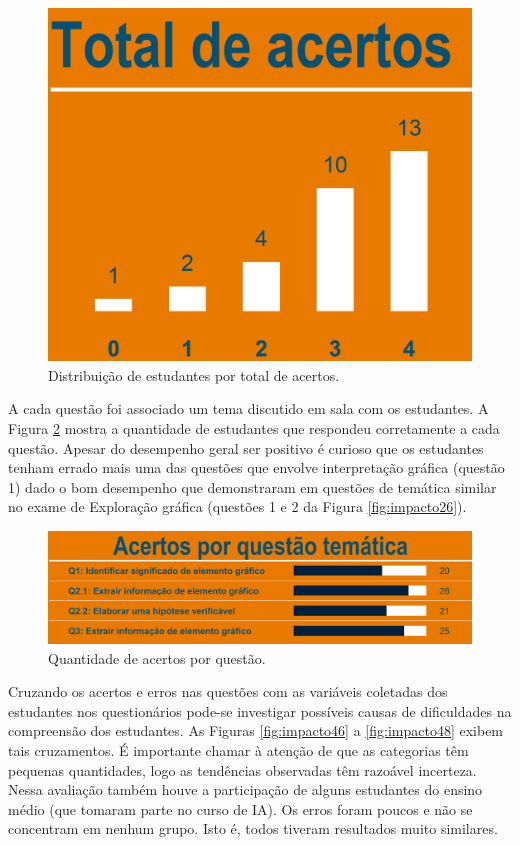 \documentclass[
]{book}
\begin{document}
\begin{figure}

{\centering \includegraphics[width=0.75\linewidth,height=0.75\textheight]{images/Impactos/44} 

}

\caption{Distribuição de estudantes por total de acertos.}\label{fig:impacto44}
\end{figure}

A cada questão foi associado um tema discutido em sala com os estudantes. A Figura \ref{fig:impacto45} mostra a quantidade de estudantes que respondeu corretamente a cada questão. Apesar do desempenho geral ser positivo é curioso que os estudantes tenham errado mais uma das questões que envolve interpretação gráfica (questão 1) dado o bom desempenho que demonstraram em questões de temática similar no exame de Exploração gráfica (questões 1 e 2 da Figura \ref{fig:impacto26}).

\begin{figure}

{\centering \includegraphics[width=0.75\linewidth,height=0.75\textheight]{images/Impactos/45} 

}

\caption{Quantidade de acertos por questão.}\label{fig:impacto45}
\end{figure}

Cruzando os acertos e erros nas questões com as variáveis coletadas dos estudantes nos questionários pode-se investigar possíveis causas de dificuldades na compreensão dos estudantes. As Figuras \ref{fig:impacto46} a \ref{fig:impacto48} exibem tais cruzamentos. É importante chamar à atenção de que as categorias têm pequenas quantidades, logo as tendências observadas têm razoável incerteza. Nessa avaliação também houve a participação de alguns estudantes do ensino médio (que tomaram parte no curso de IA). Os erros foram poucos e não se concentram em nenhum grupo. Isto é, todos tiveram resultados muito similares.
\end{document}

